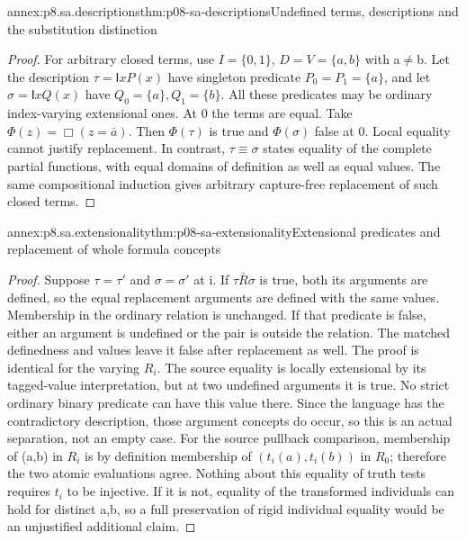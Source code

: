 \begin{annexitem}{annex:p8.sa.descriptions}{thm:p08-sa-descriptions}{Undefined terms, descriptions and the substitution distinction}
\begin{proof}
For arbitrary closed terms, use \(I=\{0,1\}\),
\(D=V=\{a,b\}\) with a\(\ne\)b. Let the description
\(\tau=\mathsf I xP(x)\) have singleton predicate
\(P_0=P_1=\{a\}\), and let
\(\sigma=\mathsf I xQ(x)\) have
\(Q_0=\{a\},Q_1=\{b\}\). All these predicates may be
ordinary index-varying extensional ones. At 0 the terms are equal.
Take \(\Phi(z)=\Box(z=\bar a)\). Then \(\Phi(\tau)\)
is true and \(\Phi(\sigma)\) false at 0. Local equality
cannot justify replacement. In contrast,
\(\tau\equiv\sigma\) states equality of the complete
partial functions, with equal domains of definition as well as
equal values. The same compositional induction gives arbitrary
capture-free replacement of such closed terms.
\end{proof}
\end{annexitem}

\begin{annexitem}{annex:p8.sa.extensionality}{thm:p08-sa-extensionality}{Extensional predicates and replacement of whole formula concepts}
\begin{proof}
Suppose \(\tau=\tau'\) and \(\sigma=\sigma'\) at i.
If \(\tau\bar R\sigma\) is true, both its arguments
are defined, so the equal replacement arguments are defined
with the same values. Membership in the ordinary relation is
unchanged. If that predicate is false, either an argument is
undefined or the pair is outside the relation. The matched
definedness and values leave it false after replacement as well.
The proof is identical for the varying \(R_i\). The source
equality is locally extensional by its tagged-value interpretation,
but at two undefined arguments it is true. No strict ordinary
binary predicate can have this value there. Since the language
has the contradictory description, those argument concepts do
occur, so this is an actual separation, not an empty case.
For the source pullback comparison, membership of (a,b) in
\(R_i\) is by definition membership of
\((t_i(a),t_i(b))\) in \(R_0\); therefore the two atomic
evaluations agree. Nothing about this equality of truth tests
requires \(t_i\) to be injective. If it is not, equality of
the transformed individuals can hold for distinct a,b, so a
full preservation of rigid individual equality would be an
unjustified additional claim.


\end{proof}
\end{annexitem}
